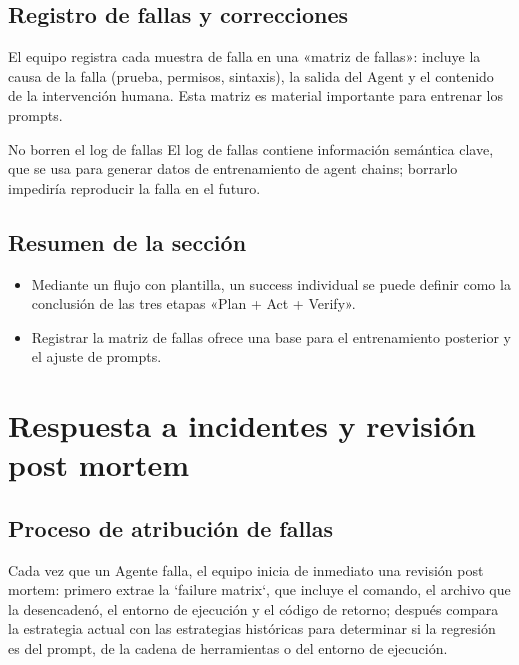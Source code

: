 \documentclass[a4paper]{article}
\begin{document}
\subsection{Registro de fallas y correcciones}
El equipo registra cada muestra de falla en una «matriz de fallas»: incluye la causa de la falla (prueba, permisos, sintaxis), la salida del Agent y el contenido de la intervención humana. Esta matriz es material importante para entrenar los prompts.

\begin{warningbox}{No borren el log de fallas}
El log de fallas contiene información semántica clave, que se usa para generar datos de entrenamiento de agent chains; borrarlo impediría reproducir la falla en el futuro.
\end{warningbox}

\subsection{Resumen de la sección}
\begin{itemize}
    \item Mediante un flujo con plantilla, un success individual se puede definir como la conclusión de las tres etapas «Plan + Act + Verify».
    \item Registrar la matriz de fallas ofrece una base para el entrenamiento posterior y el ajuste de prompts.
\end{itemize}
\section{Respuesta a incidentes y revisión post mortem}
\subsection{Proceso de atribución de fallas}
Cada vez que un Agente falla, el equipo inicia de inmediato una revisión post mortem: primero extrae la `failure matrix`, que incluye el comando, el archivo que la desencadenó, el entorno de ejecución y el código de retorno; después compara la estrategia actual con las estrategias históricas para determinar si la regresión es del prompt, de la cadena de herramientas o del entorno de ejecución.
\end{document}
